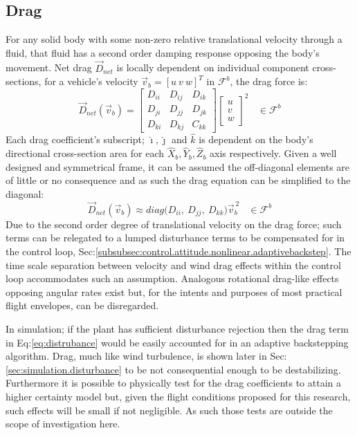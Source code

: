 \subsection{Drag}
\label{subsec:dynamics.aero.drag}
For any solid body with some non-zero relative translational velocity through a fluid, that fluid has a second order damping response opposing the body's movement. Net drag $\vec{D}_{net}$ is locally dependent on individual component cross-sections, for a vehicle's velocity $\vec{v}_b=[u~v~w]^T$ in $\mathcal{F}^b$, the drag force is:
\begin{equation}\label{eq:distrubance}
\vec{D}_{net}(\vec{v}_b)=\begin{bmatrix}
D_{ii} & D_{ij} & D_{ik}\\
D_{ji} & D_{jj} & D_{jk}\\
D_{ki} & D_{kj} & C_{kk}
\end{bmatrix}
\begin{bmatrix}
u\\
v\\
w
\end{bmatrix}^2
~~~~\in\mathcal{F}^b
\end{equation}
Each drag coefficient's subscript; $\hat{\imath},\hat{\jmath}$ and $\hat{k}$ is dependent on the body's directional cross-section area for each $\hat{X}_b,\hat{Y}_b,\hat{Z}_b$ axis respectively. Given a well designed and symmetrical frame, it can be assumed the off-diagonal elements are of little or no consequence and as such the drag equation can be simplified to the diagonal:
\begin{equation}
\vec{D}_{net}(\vec{v}_b)\approx diag\big(D_{ii},~D_{jj},~D_{kk}\big)\vec{v}_b^{\hspace{2pt}2}~~~~\in\mathcal{F}^b
\end{equation}
Due to the second order degree of translational velocity on the drag force; such terms can be relegated to a lumped disturbance terms to be compensated for in the control loop, Sec:\ref{subsubsec:control.attitude.nonlinear.adaptivebackstep}. The time scale separation between velocity and wind drag effects within the control loop accommodates such an assumption. Analogous rotational drag-like effects opposing angular rates exist but, for the intents and purposes of most practical flight envelopes, can be disregarded. 
\par
In simulation; if the plant has sufficient disturbance rejection then the drag term in Eq:\ref{eq:distrubance} would be easily accounted for in an adaptive backstepping algorithm. Drag, much like wind turbulence, is shown later in Sec:\ref{sec:simulation.disturbance} to be not consequential enough to be destabilizing. Furthermore it is possible to physically test for the drag coefficients to attain a higher certainty model but, given the flight conditions proposed for this research, such effects will be small if not negligible. As such those tests are outside the scope of investigation here.
